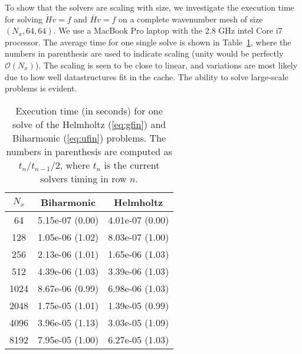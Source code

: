 \documentclass[preprint]{elsarticle}
\newcommand{\N}[1]{\check{#1}}
\newcommand{\D}[1]{\bar{#1}}
\begin{document}
To show that the solvers are scaling with size, we investigate the execution time 
for solving $\N{H} {v} = {f}$ and $\D{H} {v} = {f}$ on a complete 
wavenumber mesh of size $(N_x,64,64)$. We use a MacBook Pro laptop with the 2.8 GHz intel Core i7 processor. The average time for one single solve is shown in Table~\ref{tab:timings}, where the numbers in parenthesis are used to indicate scaling (unity would be perfectly $\mathcal{O}(N_x)$). The scaling is seen to be close to linear, and variations 
are most likely due to how well datastructures fit in the cache. The ability to solve large-scale problems is evident.
\begin{table}
	\centering
	\caption{Execution time (in seconds) for one solve  of the Helmholtz 
	(\ref{eq:gfin}) and Biharmonic 
	(\ref{eq:ufin}) problems. The numbers in parenthesis are computed as $t_n / t_{n-1} / 2$, where $t_n$ is the current solvers timing in row $n$. 	\label{tab:timings}}
	\begin{tabular}{ccc}
$N_x$ & Biharmonic & Helmholtz \\ 
\hline
64 & 5.15e-07 (0.00) & 4.01e-07 (0.00) \\ 
128 & 1.05e-06 (1.02) & 8.03e-07 (1.00) \\ 
256 & 2.13e-06 (1.01) & 1.65e-06 (1.03) \\ 
512 & 4.39e-06 (1.03) & 3.39e-06 (1.03) \\ 
1024 & 8.67e-06 (0.99) & 6.98e-06 (1.03) \\ 
2048 & 1.75e-05 (1.01) & 1.39e-05 (0.99) \\ 
4096 & 3.96e-05 (1.13) & 3.03e-05 (1.09) \\ 
8192 & 7.95e-05 (1.00) & 6.27e-05 (1.03) \\
	\end{tabular}
\end{table}
\end{document}
